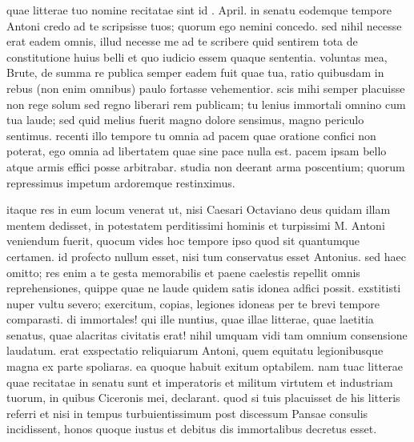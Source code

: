 


 quae litterae tuo nomine recitatae sint id . April. in senatu eodemque tempore Antoni credo ad te scripsisse tuos; quorum ego nemini concedo. sed nihil necesse erat eadem omnis, illud necesse me ad te scribere quid sentirem tota de constitutione huius belli et quo iudicio essem quaque sententia. voluntas mea, Brute, de summa re publica semper eadem fuit quae tua, ratio quibusdam in rebus (non enim omnibus) paulo fortasse vehementior. scis mihi semper placuisse non rege solum sed regno liberari rem publicam; tu lenius immortali omnino cum tua laude; sed quid melius fuerit magno dolore sensimus, magno periculo sentimus. recenti illo tempore tu omnia ad pacem quae oratione confici non poterat, ego omnia ad libertatem quae sine pace nulla est. pacem ipsam bello atque armis effici posse arbitrabar. studia non deerant arma poscentium; quorum repressimus impetum ardoremque restinximus.

 itaque res in eum locum venerat ut, nisi Caesari Octaviano deus quidam illam mentem dedisset, in potestatem perditissimi hominis et turpissimi M. Antoni veniendum fuerit, quocum vides hoc tempore ipso quod sit quantumque certamen. id profecto nullum esset, nisi tum conservatus esset Antonius. sed haec omitto; res enim a te gesta memorabilis et paene caelestis repellit omnis reprehensiones, quippe quae ne laude quidem satis idonea adfici possit. exstitisti nuper vultu severo; exercitum, copias, legiones idoneas per te brevi tempore comparasti. di immortales! qui ille nuntius, quae illae litterae, quae laetitia senatus, quae alacritas civitatis erat! nihil umquam vidi tam omnium consensione laudatum. erat exspectatio reliquiarum Antoni, quem equitatu legionibusque magna ex parte spoliaras. ea quoque habuit exitum optabilem. nam tuac litterae quae recitatae in senatu sunt et imperatoris et militum virtutem et industriam tuorum, in quibus Ciceronis mei, declarant. quod si tuis placuisset de his litteris referri et nisi in tempus turbuientissimum post discessum Pansae consulis incidissent, honos quoque iustus et debitus dis immortalibus decretus esset.

